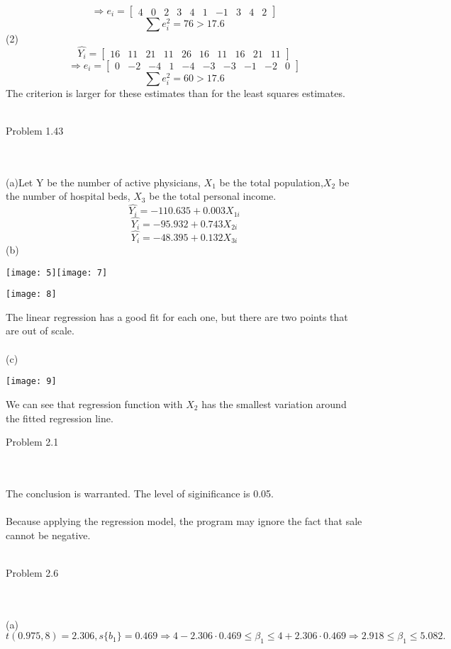 \documentclass{article}
\begin{document}
\[\Rightarrow e_i=\begin{bmatrix}4&0&2&3&4&1&-1&3&4&2\end{bmatrix}\]
\[\sum{e_i^2}=76>17.6\]
(2)\[\hat{Y_i}=\begin{bmatrix}16&11&21& 11 &26& 16& 11& 16& 21& 11\end{bmatrix}\]
\[\Rightarrow e_i=\begin{bmatrix}0&-2&-4&1&-4&-3&-3&-1&-2&0\end{bmatrix}\]
\[\sum{e_i^2}=60>17.6\]
The criterion is larger for these estimates than for the least squares estimates.
\\\\\begin{large}Problem 1.43\end{large}
\\\\(a)Let Y be the number of active physicians, $X_1$ be the total population,$X_2$ be the number of hospital beds, $X_3$ be the total personal income.
\[\hat{Y_i}=-110.635+0.003X_{1i}\]
\[\hat{Y_i}=-95.932+0.743X_{2i}\]
\[\hat{Y_i}=-48.395+0.132X_{3i}\]
(b)\begin{center}
   \texttt{[image: 5]}\texttt{[image: 7]}\end{center}
   \begin{center}\texttt{[image: 8]}
   \end{center}
The linear regression has a good fit for each one, but there are two points that are out of scale.
\\\\(c)\begin{center}\texttt{[image: 9]}
   \end{center}
   We can see that regression function with $X_2$ has the smallest variation around the fitted regression line.
\begin{large}Problem 2.1\end{large}
\\\\The conclusion is warranted. The level of siginificance is 0.05.
\\\\Because applying the regression model, the program may ignore the fact that sale cannot be negative.
\\\\\begin{large}Problem 2.6\end{large}
\\\\(a)\[t(0.975,8)=2.306,s\{b_1\}=0.469\Rightarrow 4-2.306\cdot0.469\leq\beta_1\leq4+2.306\cdot0.469\Rightarrow 2.918\leq\beta_1\leq5.082.\]
\end{document}
